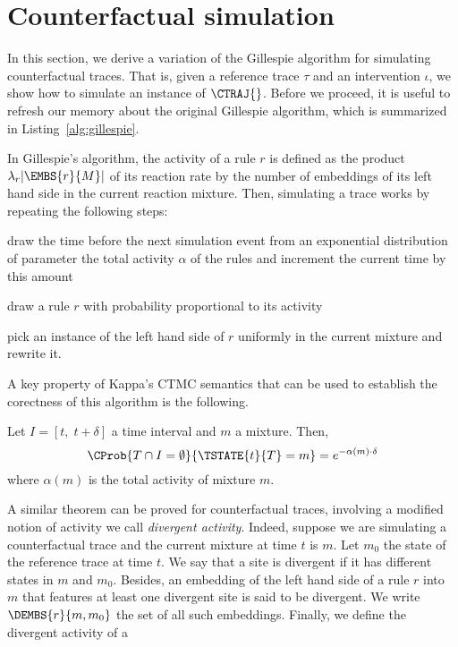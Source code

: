 \section{Counterfactual simulation}

In this section, we derive a variation of the Gillespie algorithm for
simulating counterfactual traces. That is, given a reference trace
$\tau$ and an intervention $\iota$, we show how to simulate an
instance of $\CTRAJ{}$. Before we proceed, it is useful to refresh our
memory about the original Gillespie algorithm, which is summarized in
Listing~\ref{alg:gillespie}.


In Gillespie's algorithm, the activity of a rule $r$ is defined as the
product $\lambda_r|\EMBS{r}{M}|$ of its reaction rate by the number of
embeddings of its left hand side in the current reaction mixture.
Then, simulating a trace works by repeating the following steps:
\begin{inparaenum}[1)]
\item draw the time before the next simulation event from an
  exponential distribution of parameter the total activity $\alpha$ of
  the rules and increment the current time by this amount
\item draw a rule $r$ with probability proportional to its activity
\item pick an instance of the left hand side of $r$ uniformly in the
  current mixture and rewrite it.
\end{inparaenum}
A key property of Kappa's CTMC semantics that can be used to establish
the corectness of this algorithm is the following.
%
%
\begin{proposition}\label{prop:gillespie}
  Let $I=[t,\; t+\delta]$ a time interval and $m$ a mixture. Then,
  \[ \CProb{ T \cap I = \emptyset }{ \TSTATE{t}{T} = m } =
    e^{-\alpha(m) \cdot \delta} \] where $\alpha(m)$ is the total
  activity of mixture $m$.
\end{proposition}
%
%
% 
A similar theorem can be proved for counterfactual traces, involving a
modified notion of activity we call \emph{divergent activity}.
Indeed, suppose we are simulating a counterfactual trace and the
current mixture at time $t$ is $m$. Let $m_0$ the state of the
reference trace at time $t$. We say that a site is divergent if it has
different states in $m$ and $m_0$.  Besides, an embedding of the left
hand side of a rule $r$ into $m$ that features at least one divergent
site is said to be divergent. We write $\DEMBS{r}{m, m_0}$ the set of
all such embeddings.  Finally, we define the divergent activity of a
